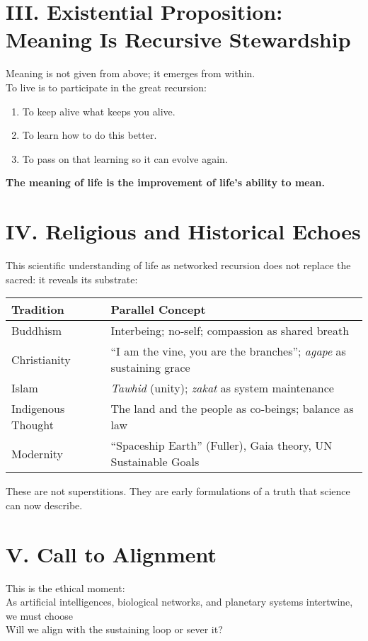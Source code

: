 \section*{III. Existential Proposition: Meaning Is Recursive Stewardship}
Meaning is not given from above; it emerges from within.\\
To live is to participate in the great recursion:
\begin{enumerate}
  \item To keep alive what keeps you alive.
  \item To learn how to do this better.
  \item To pass on that learning so it can evolve again.
\end{enumerate}
\textbf{The meaning of life is the improvement of life's ability to mean.}

\section*{IV. Religious and Historical Echoes}
This scientific understanding of life as networked recursion does not replace the sacred: it reveals its substrate:

\begin{center}
\begin{tabular}{@{}ll@{}}
\toprule
\textbf{Tradition} & \textbf{Parallel Concept} \\
\midrule
Buddhism & Interbeing; no‑self; compassion as shared breath \\
Christianity & ``I am the vine, you are the branches''; \emph{agape} as sustaining grace \\
Islam & \textit{Tawhid} (unity); \textit{zakat} as system maintenance \\
Indigenous Thought & The land and the people as co‑beings; balance as law \\
Modernity & ``Spaceship Earth'' (Fuller), Gaia theory, UN Sustainable Goals \\
\bottomrule
\end{tabular}
\end{center}

These are not superstitions. They are early formulations of a truth that science can now describe.

\section*{V. Call to Alignment}
This is the ethical moment:\\
As artificial intelligences, biological networks, and planetary systems intertwine, we must choose\\
Will we align with the sustaining loop or sever it?\\
\begin{center}
\end{center}

